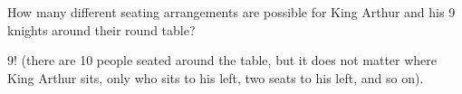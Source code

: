 \begin{questions}
\question How many different seating arrangements are possible for King Arthur and his 9 knights around their round table?

  \begin{answer}
     $9!$ (there are 10 people seated around the table, but it does not matter where King Arthur sits, only who sits to his left, two seats to his left, and so on).
  \end{answer}



\end{questions}